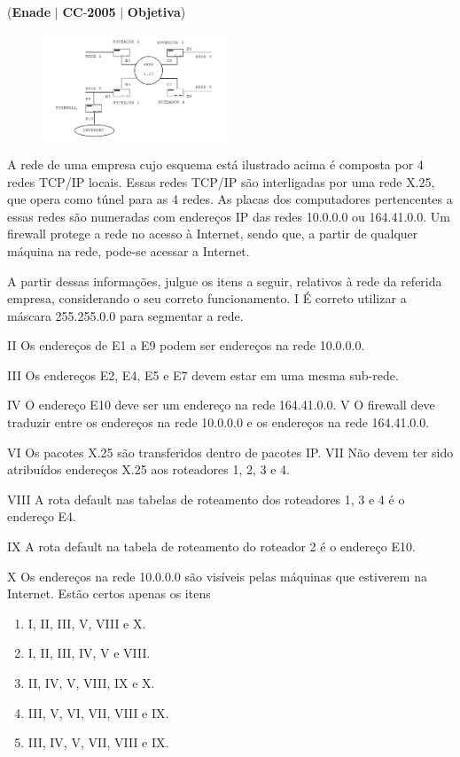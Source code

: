 \documentclass{exam}
\begin{document}
\begin{questions}
\question (\textbf{Enade} $|$ \textbf{CC}-\textbf{2005} $|$ \textbf{Objetiva})


\begin{figure}[H]
	\begin{center}
		\includegraphics[width=0.5\textwidth]{CIENCIA_DA_COMPUTACAO_Prova2005-utf8_figuras/fig-0034.jpg}
	\end{center}
\end{figure}

A rede de uma empresa cujo esquema está ilustrado
acima é composta por 4 redes TCP/IP locais. Essas redes
TCP/IP são interligadas por uma rede X.25, que opera
como túnel para as 4 redes. As placas dos computadores
pertencentes a essas redes são numeradas com endereços IP
das redes 10.0.0.0 ou 164.41.0.0. Um firewall protege a
rede no acesso à Internet, sendo que, a partir de qualquer
máquina na rede, pode-se acessar a Internet.

A partir dessas informações, julgue os itens a seguir, relativos à
rede da referida empresa, considerando o seu correto
funcionamento.
I É correto utilizar a máscara 255.255.0.0 para segmentar a
rede.

II Os endereços de E1 a E9 podem ser endereços na rede
10.0.0.0.

III Os endereços E2, E4, E5 e E7 devem estar em uma mesma
sub-rede.

IV O endereço E10 deve ser um endereço na rede 164.41.0.0.
V O firewall deve traduzir entre os endereços na rede 10.0.0.0
e os endereços na rede 164.41.0.0.

VI Os pacotes X.25 são transferidos dentro de pacotes IP.
VII Não devem ter sido atribuídos endereços X.25 aos
roteadores 1, 2, 3 e 4.

VIII A rota default nas tabelas de roteamento dos roteadores
1, 3 e 4 é o endereço E4.

IX A rota default na tabela de roteamento do roteador 2 é o
endereço E10.

X Os endereços na rede 10.0.0.0 são visíveis pelas máquinas
que estiverem na Internet.
Estão certos apenas os itens
	\begin{enumerate}[label=\alph*)]
		\item  I, II, III, V, VIII e X.
		\item  I, II, III, IV, V e VIII.
		\item  II, IV, V, VIII, IX e X.
		\item  III, V, VI, VII, VIII e IX.
		\item  III, IV, V, VII, VIII e IX.
	\end{enumerate}


\end{questions}
\end{document}
